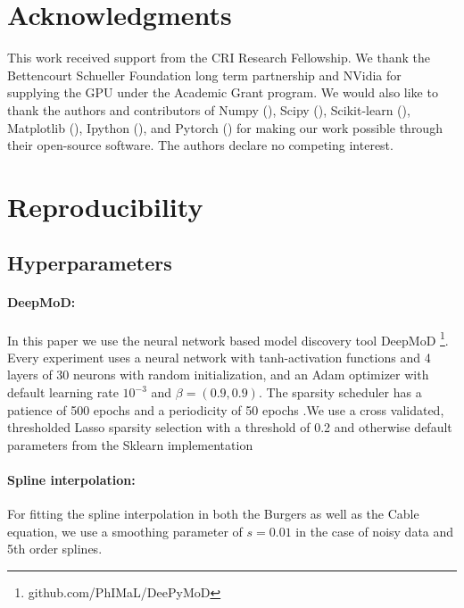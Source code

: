 \documentclass{article} %
\begin{document}
\section*{Acknowledgments}
This work received support from the CRI Research Fellowship. We thank the Bettencourt Schueller Foundation long term partnership and NVidia for supplying the GPU under the Academic Grant program. We would also like to thank the authors and contributors of Numpy (\cite{harris_array_2020}), Scipy (\cite{virtanen_scipy_2020}), Scikit-learn (\cite{pedregosa2011scikit}), Matplotlib (\cite{hunter_matplotlib_2007}), Ipython (\cite{perez_ipython_2007}), and Pytorch (\cite{paszke_pytorch_2019}) for making our work possible through their open-source software. The authors declare no competing interest.




\appendix

\section{Reproducibility}

\subsection{Hyperparameters}

\paragraph{DeepMoD:} In this paper we use the neural network based model discovery tool DeepMoD \footnote{github.com/PhIMaL/DeePyMoD}. Every experiment uses a neural network with tanh-activation functions and 4 layers of 30 neurons with random initialization, and an Adam optimizer with default learning rate $10^{-3}$ and $\beta = (0.9,0.9)$. The sparsity scheduler has a patience of 500 epochs and a periodicity of 50 epochs \cite{both2020}.We use a cross validated, thresholded Lasso sparsity selection with a threshold of 0.2 and otherwise default parameters from the Sklearn implementation \cite{pedregosa2011scikit}

\paragraph{Spline interpolation:} For fitting the spline interpolation in both the Burgers as well as the Cable equation, we use a smoothing parameter of $s = 0.01$ in the case of noisy data and 5th order splines.
\end{document}
